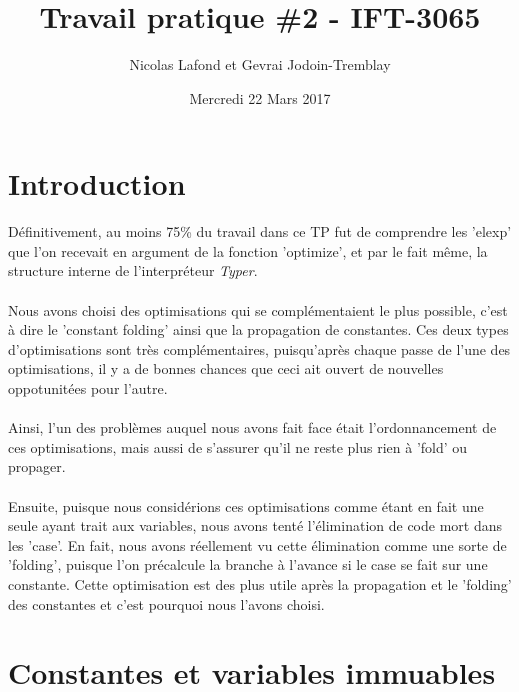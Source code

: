 \documentclass{article}
\begin{document}
\title{Travail pratique \#2 - IFT-3065}
\author{Nicolas Lafond et Gevrai Jodoin-Tremblay}
\date{Mercredi 22 Mars 2017}
\maketitle

\section{Introduction}

Définitivement, au moins 75\% du travail dans ce TP fut de comprendre les
'elexp' que l'on recevait en argument de la fonction 'optimize', et par
le fait même, la structure interne de l'interpréteur \emph{Typer}.

\paragraph{}
Nous avons choisi des optimisations qui se complémentaient le plus possible,
c'est à dire le 'constant folding' ainsi que la propagation de constantes.
Ces deux types d'optimisations sont très complémentaires, puisqu'après chaque
passe de l'une des optimisations, il y a de bonnes chances que ceci ait ouvert
de nouvelles oppotunitées pour l'autre.

\paragraph{}
Ainsi, l'un des problèmes auquel nous avons fait face était l'ordonnancement
de ces optimisations, mais aussi de s'assurer qu'il ne reste plus rien à
'fold' ou propager.

\paragraph{}
Ensuite, puisque nous considérions ces optimisations comme étant en fait une
seule ayant trait aux variables, nous avons tenté l'élimination de code mort
dans les 'case'. En fait, nous avons réellement vu cette élimination comme
une sorte de 'folding', puisque l'on précalcule la branche à l'avance si le
case se fait sur une constante. Cette optimisation est des plus utile après
la propagation et le 'folding' des constantes et c'est pourquoi nous l'avons
choisi.

\section{Constantes et variables immuables}
\end{document}
